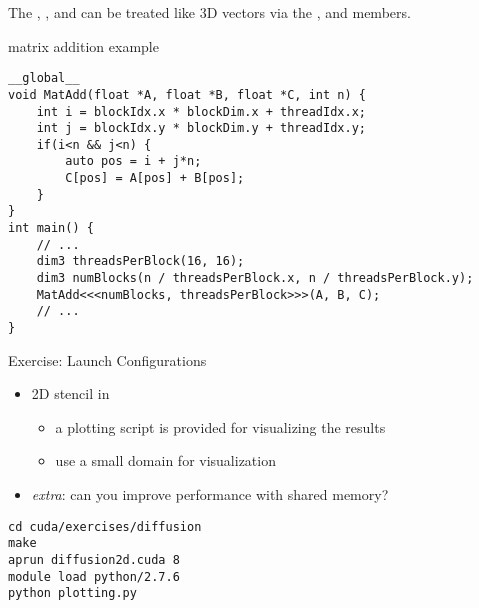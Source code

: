 \begin{frame}[fragile]{}

    The , ,  and  can be treated like 3D vectors via the ,  and  members.
    \begin{code}{matrix addition example}
        \begin{lstlisting}[style=boxcudatiny]
__global__
void MatAdd(float *A, float *B, float *C, int n) {
    int i = blockIdx.x * blockDim.x + threadIdx.x;
    int j = blockIdx.y * blockDim.y + threadIdx.y;
    if(i<n && j<n) {
        auto pos = i + j*n;
        C[pos] = A[pos] + B[pos];
    }
}
int main() {
    // ...
    dim3 threadsPerBlock(16, 16);
    dim3 numBlocks(n / threadsPerBlock.x, n / threadsPerBlock.y);
    MatAdd<<<numBlocks, threadsPerBlock>>>(A, B, C);
    // ...
}
        \end{lstlisting}
   \end{code}

\end{frame}

\begin{frame}[fragile]{Exercise: Launch Configurations}
    \begin{itemize}
        \item 2D stencil in 
        \begin{itemize}
            \item a plotting script is provided for visualizing the results
            \item use a small domain for visualization
        \end{itemize}
        \item \emph{extra}: can you improve performance with shared memory?
    \end{itemize}

    \begin{code}{}
        \begin{lstlisting}[style=boxcudatiny]
cd cuda/exercises/diffusion
make
aprun diffusion2d.cuda 8
module load python/2.7.6
python plotting.py
        \end{lstlisting}
   \end{code}

\end{frame}

